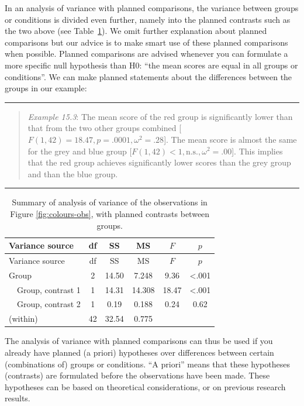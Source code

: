 \documentclass[
]{book}
\begin{document}
In an analysis of variance with planned comparisons, the variance between
groups or conditions is divided even further, namely into the planned
contrasts such as the two above (see
Table~\ref{tab:colours-anova-contrast}). We omit further explanation
about planned comparisons but our advice is to make
smart use of these planned comparisons when possible. Planned comparisons are advised whenever
you can formulate a more
specific null hypothesis than H0: ``the mean scores are equal
in all groups or conditions''. We can make planned statements
about the differences between the groups in our example:

\begin{center}\rule{0.5\linewidth}{0.5pt}\end{center}

\begin{quote}
\emph{Example 15.3}:
The mean score of the red
group is significantly lower than that from the two other groups combined
{[}\(F(1,42)=18.47, p=.0001, \omega^2=.28\){]}. The mean score is
almost the same for the grey and blue group
{[}\(F(1,42)<1, \textrm{n.s.}, \omega^2=.00\){]}.
This implies that the red group achieves significantly lower scores than the
grey group and than the blue group.
\end{quote}

\begin{center}\rule{0.5\linewidth}{0.5pt}\end{center}

\begin{longtable}[]{@{}lccccc@{}}
\caption{\label{tab:colours-anova-contrast} Summary of analysis of variance of the observations in Figure \ref{fig:colours-obs}, with planned contrasts between groups.}\tabularnewline
\toprule\noalign{}
Variance source & df & SS & MS & \(F\) & \(p\) \\
\midrule\noalign{}
\endfirsthead
\toprule\noalign{}
Variance source & df & SS & MS & \(F\) & \(p\) \\
\midrule\noalign{}
\endhead
\bottomrule\noalign{}
\endlastfoot
Group & 2 & 14.50 & 7.248 & 9.36 & \textless.001 \\
~~Group, contrast 1 & 1 & 14.31 & 14.308 & 18.47 & \textless.001 \\
~~Group, contrast 2 & 1 & 0.19 & 0.188 & 0.24 & 0.62 \\
(within) & 42 & 32.54 & 0.775 & & \\
\end{longtable}

The analysis of variance with planned comparisons can thus be used
if you already have planned (a priori) hypotheses over differences between
certain (combinations of) groups or conditions. ``A priori'' means that these
hypotheses (contrasts) are formulated before the observations have been made.
These hypotheses can be based on theoretical considerations, or on
previous research results.
\end{document}
